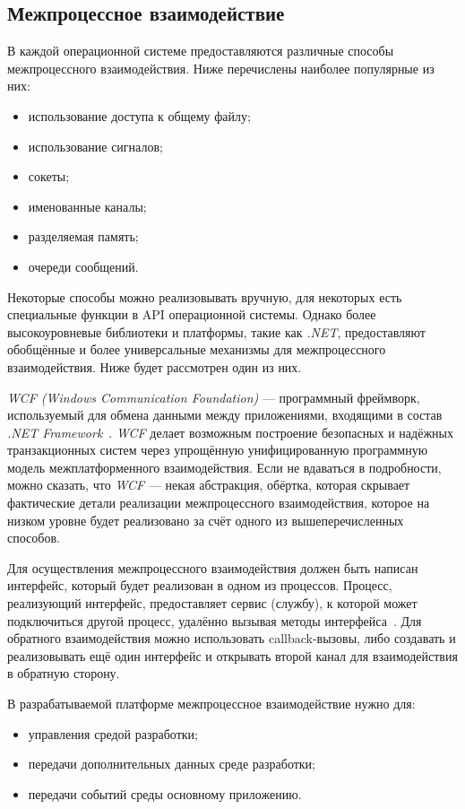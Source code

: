 \subsection{Межпроцессное взаимодействие}
\label{sec:ipc}

В каждой операционной системе предоставляются различные способы межпроцессного взаимодействия. Ниже перечислены наиболее популярные из них:
\begin{itemize}
   \item использование доступа к общему файлу;
   \item использование сигналов;
   \item сокеты;
   \item именованные каналы;
   \item разделяемая память;
   \item очереди сообщений.
\end{itemize}

Некоторые способы можно реализовывать вручную, для некоторых есть специальные функции в API операционной системы. Однако более высокоуровневые библиотеки и платформы, такие как {\it .NET}, предоставляют обобщённые и более универсальные механизмы для межпроцессного взаимодействия. Ниже будет рассмотрен один из них.

{\it WCF (Windows Communication Foundation)} --- программный фреймворк, используемый для обмена данными между приложениями, входящими в состав {\it .NET Framework}~\cite{wcf-unleashed}. {\it WCF} делает возможным построение безопасных и надёжных транзакционных систем через упрощённую унифицированную программную модель межплатформенного взаимодействия. Если не вдаваться в подробности, можно сказать, что {\it WCF} --- некая абстракция, обёртка, которая скрывает фактические детали реализации межпроцессного взаимодействия, которое на низком уровне будет реализовано за счёт одного из вышеперечисленных способов. 

Для осуществления межпроцессного взаимодействия должен быть написан интерфейс, который будет реализован в одном из процессов. Процесс, реализующий интерфейс, предоставляет сервис (службу), к которой может подключиться другой процесс, удалённо вызывая методы интерфейса~\cite{wcf-services}. Для обратного взаимодействия можно использовать callback-вызовы, либо создавать и реализовывать ещё один интерфейс и открывать второй канал для взаимодействия в обратную сторону. 

В разрабатываемой платформе межпроцессное взаимодействие нужно для:
\begin{itemize}
 \item управления средой разработки;
 \item передачи дополнительных данных среде разработки;
 \item передачи событий среды основному приложению.
\end{itemize}


\pagebreak
